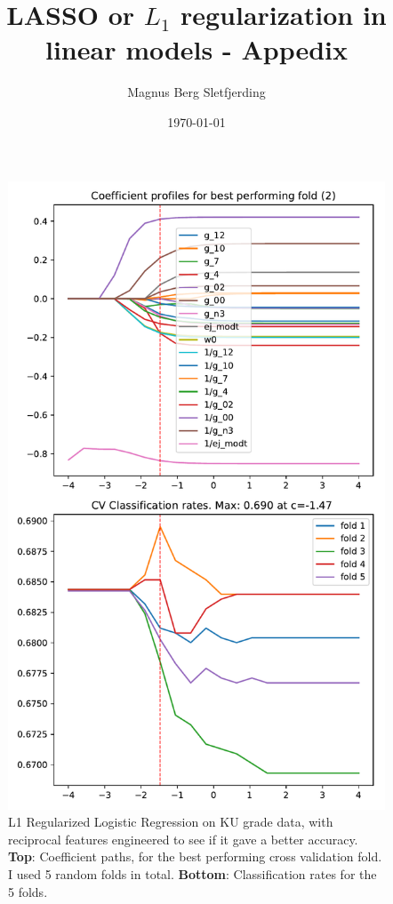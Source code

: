 \documentclass[%
 reprint,
 amsmath,amssymb,
 aps,
]{revtex4-1}
\begin{document}

\title{LASSO or $L_1$ regularization in linear models - Appedix}%

\author{Magnus Berg Sletfjerding}

%

\date{\today}%


\maketitle

\begin{figure}[H]
 \includegraphics[width=0.9\linewidth]{../figs/LogRegCV_KU_div}
 \caption{L1 Regularized Logistic Regression on KU grade data, with reciprocal features engineered to see if it gave a better accuracy.
 \textbf{Top}: Coefficient paths, for the best performing cross validation fold.
 I used 5 random folds in total.
 \textbf{Bottom}: Classification rates for the 5 folds.
 }
\end{figure}
\end{document}
